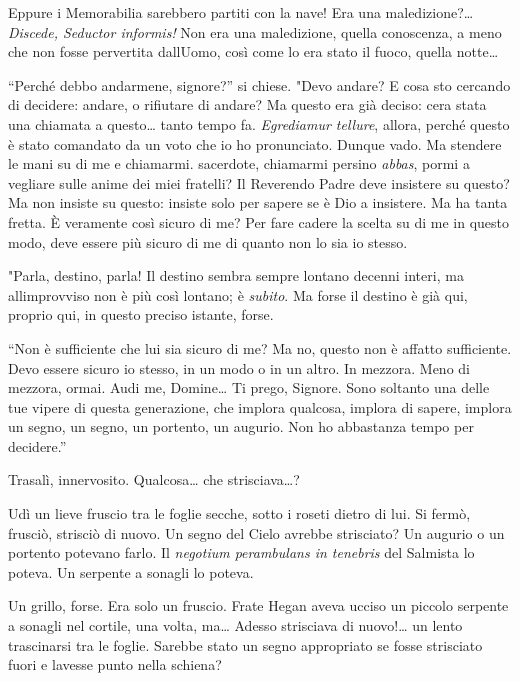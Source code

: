 Eppure i Memorabilia sarebbero partiti con la nave! Era una
maledizione?\ldots{} \emph{Discede, Seductor informis!} Non era una
maledizione, quella conoscenza, a meno che non fosse pervertita
dall\textquotesingle Uomo, così come lo era stato il fuoco, quella
notte\ldots{}

``Perché debbo andarmene, signore?'' si chiese. "Devo andare? E cosa sto
cercando di decidere: andare, o rifiutare di andare? Ma questo era già
deciso: c\textquotesingle era stata una chiamata a questo\ldots{} tanto
tempo fa. \emph{Egrediamur tellure}, allora, perché questo è stato
comandato da un voto che io ho pronunciato. Dunque vado. Ma stendere le
mani su di me e chiamarmi. sacerdote, chiamarmi persino \emph{abbas},
pormi a vegliare sulle anime dei miei fratelli? Il Reverendo Padre deve
insistere su questo? Ma non insiste su questo: insiste solo per sapere
se è Dio a insistere. Ma ha tanta fretta. È veramente così sicuro di me?
Per fare cadere la scelta su di me in questo modo, deve essere più
sicuro di me di quanto non lo sia io stesso.

"Parla, destino, parla! Il destino sembra sempre lontano decenni interi,
ma all\textquotesingle improvviso non è più così lontano; è
\emph{subito}. Ma forse il destino è già qui, proprio qui, in questo
preciso istante, forse.

``Non è sufficiente che lui sia sicuro di me? Ma no, questo non è
affatto sufficiente. Devo essere sicuro io stesso, in un modo o in un
altro. In mezz\textquotesingle ora. Meno di mezz\textquotesingle ora,
ormai. Audi me, Domine\ldots{} Ti prego, Signore. Sono soltanto una
delle tue vipere di questa generazione, che implora qualcosa, implora di
sapere, implora un segno, un segno, un portento, un augurio. Non ho
abbastanza tempo per decidere.''

Trasalì, innervosito. Qualcosa\ldots{} che strisciava\ldots?

Udì un lieve fruscio tra le foglie secche, sotto i roseti dietro di lui.
Si fermò, frusciò, strisciò di nuovo. Un segno del Cielo avrebbe
strisciato? Un augurio o un portento potevano farlo. Il \emph{negotium
	perambulans in tenebris} del Salmista lo poteva. Un serpente a sonagli
lo poteva.

Un grillo, forse. Era solo un fruscio. Frate Hegan aveva ucciso un
piccolo serpente a sonagli nel cortile, una volta, ma\ldots{} Adesso
strisciava di nuovo!\ldots{} un lento trascinarsi tra le foglie. Sarebbe
stato un segno appropriato se fosse strisciato fuori e
l\textquotesingle avesse punto nella schiena?

